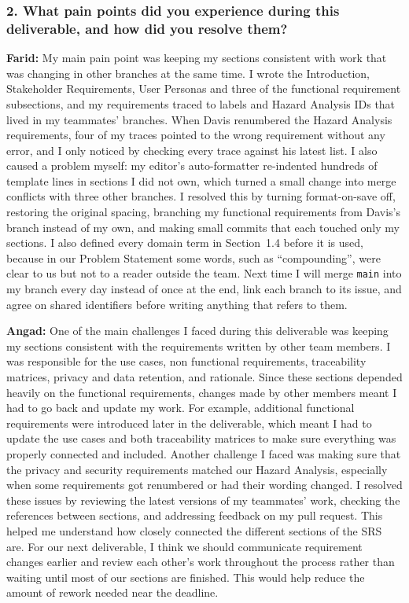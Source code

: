 \documentclass[12pt]{article}
\begin{document}
\subsubsection*{2. What pain points did you experience during this deliverable,
and how did you resolve them?}

\noindent\textbf{Farid:} My main pain point was keeping my sections consistent with work
that was changing in other branches at the same time. I wrote the Introduction,
Stakeholder Requirements, User Personas and three of the functional requirement
subsections, and my requirements traced to labels and Hazard Analysis IDs that
lived in my teammates' branches. When Davis renumbered the Hazard Analysis
requirements, four of my traces pointed to the wrong requirement without any
error, and I only noticed by checking every trace against his latest list. I
also caused a problem myself: my editor's auto-formatter re-indented hundreds of
template lines in sections I did not own, which turned a small change into
merge conflicts with three other branches. I resolved this by turning
format-on-save off, restoring the original spacing, branching my functional
requirements from Davis's branch instead of my own, and making small commits
that each touched only my sections. I also defined every domain term in
Section~1.4 before it is used, because in our Problem Statement some words,
such as ``compounding'', were clear to us but not to a reader outside the team.
Next time I will merge \texttt{main} into my branch every day instead of once at
the end, link each branch to its issue, and agree on shared identifiers before
writing anything that refers to them.

\bigskip
\noindent
\textbf{Angad:} One of the main challenges I faced during this deliverable
was keeping my sections consistent with the requirements written by other
team members. I was responsible for the use cases, non functional
requirements, traceability matrices, privacy and data retention, and
rationale. Since these sections depended heavily on the functional
requirements, changes made by other members meant I had to go back
and update my work. For example, additional functional requirements
were introduced later in the deliverable, which meant I had to
update the use cases and both traceability matrices to make sure
everything was properly connected and included. Another challenge I faced was making
sure that the privacy and security requirements matched our Hazard
Analysis, especially when some requirements got renumbered or
had their wording changed. I resolved these issues by reviewing
the latest versions of my teammates' work, checking the
references between sections, and addressing feedback on my
pull request. This helped me understand how closely connected
the different sections of the SRS are. For our next deliverable,
I think we should communicate requirement changes earlier and
review each other's work throughout the process rather than
waiting until most of our sections are finished. This would
help reduce the amount of rework needed near the deadline.
\end{document}
